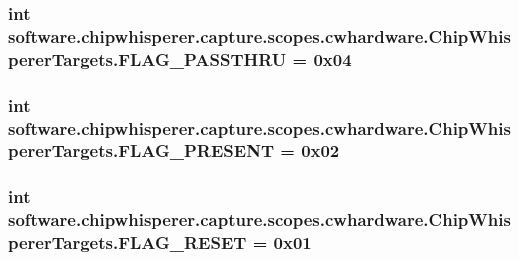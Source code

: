 \subsubsection[{F\+L\+A\+G\+\_\+\+P\+A\+S\+S\+T\+H\+R\+U}]{\setlength{\rightskip}{0pt plus 5cm}int software.\+chipwhisperer.\+capture.\+scopes.\+cwhardware.\+Chip\+Whisperer\+Targets.\+F\+L\+A\+G\+\_\+\+P\+A\+S\+S\+T\+H\+R\+U = 0x04}\label{namespacesoftware_1_1chipwhisperer_1_1capture_1_1scopes_1_1cwhardware_1_1ChipWhispererTargets_aa2a8b912dee4a68aa510ab588d7be747}
\hypertarget{namespacesoftware_1_1chipwhisperer_1_1capture_1_1scopes_1_1cwhardware_1_1ChipWhispererTargets_a8e82bf4f18dcd57850eeb7e04572ccba}{}
\subsubsection[{F\+L\+A\+G\+\_\+\+P\+R\+E\+S\+E\+N\+T}]{\setlength{\rightskip}{0pt plus 5cm}int software.\+chipwhisperer.\+capture.\+scopes.\+cwhardware.\+Chip\+Whisperer\+Targets.\+F\+L\+A\+G\+\_\+\+P\+R\+E\+S\+E\+N\+T = 0x02}\label{namespacesoftware_1_1chipwhisperer_1_1capture_1_1scopes_1_1cwhardware_1_1ChipWhispererTargets_a8e82bf4f18dcd57850eeb7e04572ccba}
\hypertarget{namespacesoftware_1_1chipwhisperer_1_1capture_1_1scopes_1_1cwhardware_1_1ChipWhispererTargets_a371719a5ec26a9b046ba34f4847ef249}{}
\subsubsection[{F\+L\+A\+G\+\_\+\+R\+E\+S\+E\+T}]{\setlength{\rightskip}{0pt plus 5cm}int software.\+chipwhisperer.\+capture.\+scopes.\+cwhardware.\+Chip\+Whisperer\+Targets.\+F\+L\+A\+G\+\_\+\+R\+E\+S\+E\+T = 0x01}\label{namespacesoftware_1_1chipwhisperer_1_1capture_1_1scopes_1_1cwhardware_1_1ChipWhispererTargets_a371719a5ec26a9b046ba34f4847ef249}
